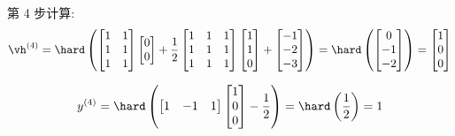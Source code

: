 \documentclass[openany]{ctexbook}
\theoremstyle{kaiti}
\theoremstyle{normal}
\begin{document}
第 4 步计算:
\begin{equation}
  \vh^{(4)}
  =\hard\left(
    \begin{bmatrix}
      1 & 1 \\
      1 & 1 \\
      1 & 1 \\
    \end{bmatrix}
    \begin{bmatrix}
      0 \\ 0 \\
    \end{bmatrix}
    +\frac{1}{2}
    \begin{bmatrix}
      1 & 1 & 1 \\
      1 & 1 & 1 \\
      1 & 1 & 1 \\
    \end{bmatrix}
    \begin{bmatrix}
      1 \\ 1 \\ 0 \\
    \end{bmatrix}
    +
    \begin{bmatrix}
      -1 \\ -2 \\ -3 \\
    \end{bmatrix}
  \right)
  =\hard\left(
    \begin{bmatrix}
      0 \\ -1 \\ -2 \\
    \end{bmatrix}
  \right)
  =
  \begin{bmatrix}
    1 \\ 0 \\ 0 \\
  \end{bmatrix}
\end{equation}

\begin{equation}
  y^{(4)}
  =\hard\left(
    \begin{bmatrix}
      1 & -1 & 1 \\
    \end{bmatrix}
    \begin{bmatrix}
      1 \\ 0 \\ 0 \\
    \end{bmatrix}
    -\frac{1}{2}
  \right)
  =\hard\left(
    \frac{1}{2}
  \right)
  =1
\end{equation}
\end{document}
